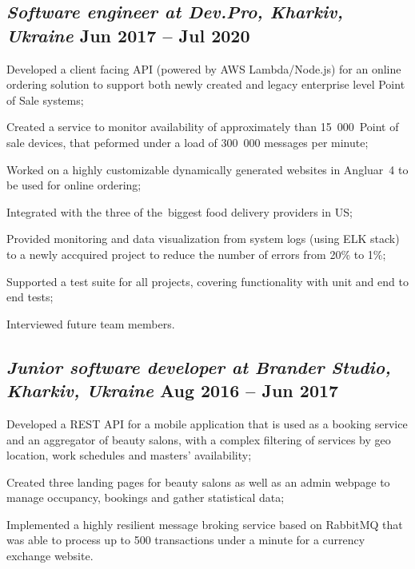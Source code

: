 \documentclass[a4paper,12pt]{book}
\begin{document}
\subsection{{\sl\bf\hspace{0.1in}Software engineer at Dev.Pro, Kharkiv, Ukraine} \hfill Jun 2017 -- Jul 2020}
\begin{zitemize}
 \item Developed a client facing API (powered by AWS Lambda/Node.js) for an online ordering solution to support both newly created and legacy enterprise level Point of Sale systems;
 \item Created a service to monitor availability of approximately than 15~000~Point of sale devices, that peformed under a load of 300~000 messages per minute;
 \item Worked on a highly customizable dynamically generated websites in Angluar~4 to be used for online ordering;
 \item Integrated with the three of the~biggest food delivery providers in US;
 \item Provided monitoring and data visualization from system logs (using ELK stack) to a newly accquired project to reduce the number of errors from 20\% to 1\%;
 \item Supported a test suite for all projects, covering functionality with unit and end to end tests;
 \item Interviewed future team members.
\end{zitemize}

\subsection{{\sl\bf\hspace{0.1in} Junior software developer at Brander Studio, Kharkiv, Ukraine} \hfill Aug 2016 -- Jun 2017}
\begin{zitemize}
 \item Developed a REST API for a mobile application that is used as a booking service and an aggregator of beauty salons, with a complex filtering of services by geo location, work schedules and masters' availability;
 \item Created three landing pages for beauty salons as well as an admin webpage to manage occupancy, bookings and gather statistical data;
 \item Implemented a highly resilient message broking service based on RabbitMQ that was able to process up to 500 transactions under a minute for a currency exchange website.
\end{zitemize}
\end{document}
